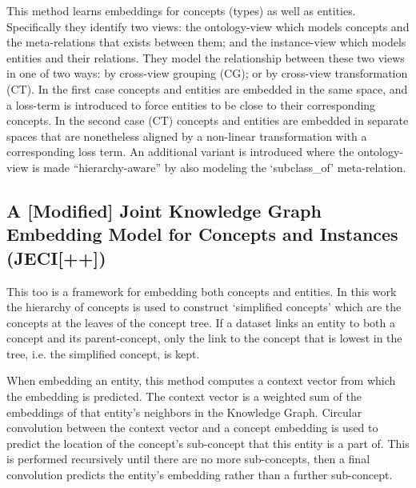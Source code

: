 This method learns embeddings for concepts (types) as well as entities. Specifically they identify two views: the ontology-view which models concepts and the meta-relations that exists between them; and the instance-view which models entities and their relations. They model the relationship between these two views in one of two ways: by cross-view grouping (CG); or by cross-view transformation (CT). 
In the first case concepts and entities are embedded in the same space, and a loss-term is introduced to force entities to be close to their corresponding concepts. 
In the second case (CT) concepts and entities are embedded in separate spaces that are nonetheless aligned by a non-linear transformation with a corresponding loss term. 
An additional variant is introduced where the ontology-view is made ``hierarchy-aware'' by also modeling the `subclass\_of' meta-relation.



\subsection{A [Modified] Joint Knowledge Graph Embedding Model for Concepts and Instances \texorpdfstring{(JECI[++]) \citep{zhou2020jeci,wang2020jeci}}{}}

This too is a framework for embedding both concepts and entities. 
In this work the hierarchy of concepts is used to construct `simplified concepts' which are the concepts at the leaves of the concept tree.
If a dataset links an entity to both a concept and its parent-concept, only the link to the concept that is lowest in the tree, i.e. the simplified concept, is kept.

When embedding an entity, this method computes a context vector from which the embedding is predicted. The context vector is a weighted sum of the embeddings of that entity's neighbors in the Knowledge Graph. 
Circular convolution between the context vector and a concept embedding is used to predict the location of the concept's sub-concept that this entity is a part of. This is performed recursively until there are no more sub-concepts, then a final convolution predicts the entity's embedding rather than a further sub-concept.

